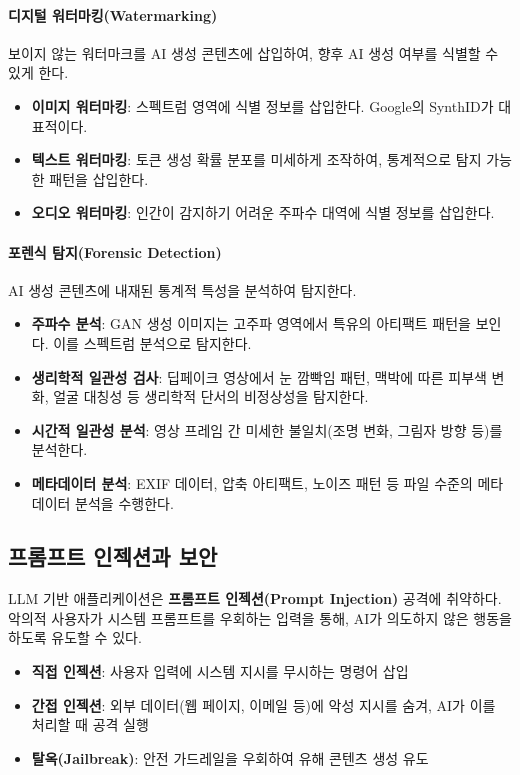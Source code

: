 \paragraph{디지털 워터마킹(Watermarking)}
보이지 않는 워터마크를 AI 생성 콘텐츠에 삽입하여, 향후 AI 생성 여부를 식별할 수 있게 한다.

\begin{itemize}
 \item \textbf{이미지 워터마킹}: 스펙트럼 영역에 식별 정보를 삽입한다. Google의 SynthID가 대표적이다.
 \item \textbf{텍스트 워터마킹}: 토큰 생성 확률 분포를 미세하게 조작하여, 통계적으로 탐지 가능한 패턴을 삽입한다.
 \item \textbf{오디오 워터마킹}: 인간이 감지하기 어려운 주파수 대역에 식별 정보를 삽입한다.
\end{itemize}

\paragraph{포렌식 탐지(Forensic Detection)}
AI 생성 콘텐츠에 내재된 통계적 특성을 분석하여 탐지한다.

\begin{itemize}
 \item \textbf{주파수 분석}: GAN 생성 이미지는 고주파 영역에서 특유의 아티팩트 패턴을 보인다. 이를 스펙트럼 분석으로 탐지한다.
 \item \textbf{생리학적 일관성 검사}: 딥페이크 영상에서 눈 깜빡임 패턴, 맥박에 따른 피부색 변화, 얼굴 대칭성 등 생리학적 단서의 비정상성을 탐지한다.
 \item \textbf{시간적 일관성 분석}: 영상 프레임 간 미세한 불일치(조명 변화, 그림자 방향 등)를 분석한다.
 \item \textbf{메타데이터 분석}: EXIF 데이터, 압축 아티팩트, 노이즈 패턴 등 파일 수준의 메타데이터 분석을 수행한다.
\end{itemize}

\subsection{프롬프트 인젝션과 보안}
\label{sec:gen.1.4}

LLM 기반 애플리케이션은 \textbf{프롬프트 인젝션(Prompt Injection)} 공격에 취약하다. 악의적 사용자가 시스템 프롬프트를 우회하는 입력을 통해, AI가 의도하지 않은 행동을 하도록 유도할 수 있다.

\begin{itemize}
 \item \textbf{직접 인젝션}: 사용자 입력에 시스템 지시를 무시하는 명령어 삽입
 \item \textbf{간접 인젝션}: 외부 데이터(웹 페이지, 이메일 등)에 악성 지시를 숨겨, AI가 이를 처리할 때 공격 실행
 \item \textbf{탈옥(Jailbreak)}: 안전 가드레일\cite{casper2023explore}을 우회하여 유해 콘텐츠 생성 유도
\end{itemize}

